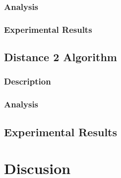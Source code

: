 \documentclass[twoside]{article}
\begin{document}
\subsubsection{Analysis}

\subsubsection{Experimental Results}

\subsection{Distance 2 Algorithm}
\subsubsection{Description}




\subsubsection{Analysis}

\subsection{Experimental Results}
\label{sub:experiment-erdren-direct}

\section{Discusion}



\end{document}

